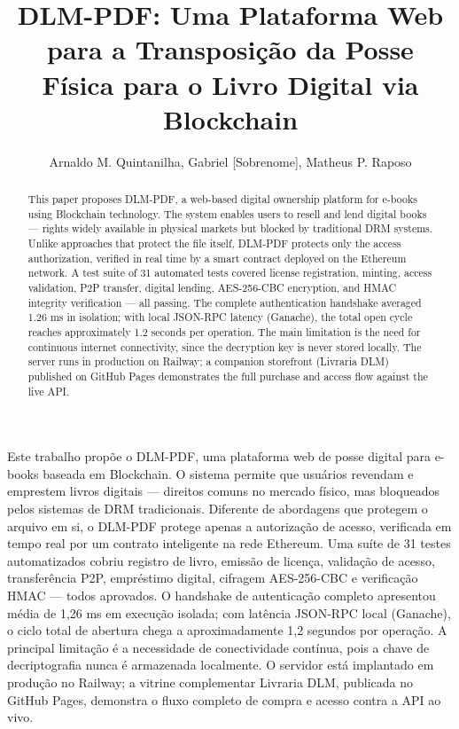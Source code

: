 \documentclass[12pt]{article}
\title{DLM-PDF: Uma Plataforma Web para a Transposição da Posse Física para o Livro Digital via Blockchain}
\author{Arnaldo M. Quintanilha\inst{1}, Gabriel [Sobrenome]\inst{1}, Matheus P. Raposo\inst{2}}
\begin{document}
\maketitle

\begin{abstract}
This paper proposes DLM-PDF, a web-based digital ownership platform for e-books using Blockchain technology. The system enables users to resell and lend digital books — rights widely available in physical markets but blocked by traditional DRM systems. Unlike approaches that protect the file itself, DLM-PDF protects only the access authorization, verified in real time by a smart contract deployed on the Ethereum network. A test suite of 31 automated tests covered license registration, minting, access validation, P2P transfer, digital lending, AES-256-CBC encryption, and HMAC integrity verification — all passing. The complete authentication handshake averaged 1.26 ms in isolation; with local JSON-RPC latency (Ganache), the total open cycle reaches approximately 1.2 seconds per operation. The main limitation is the need for continuous internet connectivity, since the decryption key is never stored locally. The server runs in production on Railway; a companion storefront (Livraria DLM) published on GitHub Pages demonstrates the full purchase and access flow against the live API.
\end{abstract}

\begin{resumo}
Este trabalho propõe o DLM-PDF, uma plataforma web de posse digital para e-books baseada em Blockchain. O sistema permite que usuários revendam e emprestem livros digitais — direitos comuns no mercado físico, mas bloqueados pelos sistemas de DRM tradicionais. Diferente de abordagens que protegem o arquivo em si, o DLM-PDF protege apenas a autorização de acesso, verificada em tempo real por um contrato inteligente na rede Ethereum. Uma suíte de 31 testes automatizados cobriu registro de livro, emissão de licença, validação de acesso, transferência P2P, empréstimo digital, cifragem AES-256-CBC e verificação HMAC — todos aprovados. O handshake de autenticação completo apresentou média de 1,26 ms em execução isolada; com latência JSON-RPC local (Ganache), o ciclo total de abertura chega a aproximadamente 1,2 segundos por operação. A principal limitação é a necessidade de conectividade contínua, pois a chave de decriptografia nunca é armazenada localmente. O servidor está implantado em produção no Railway; a vitrine complementar Livraria DLM, publicada no GitHub Pages, demonstra o fluxo completo de compra e acesso contra a API ao vivo.
\end{resumo}
\end{document}
